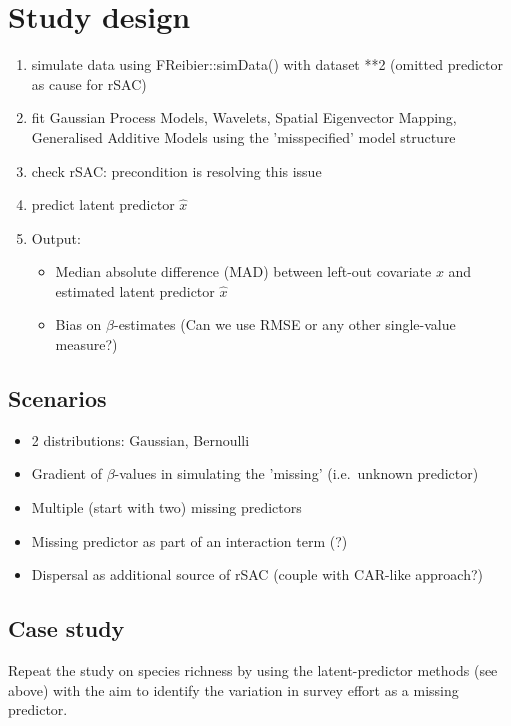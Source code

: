 \documentclass[11pt]{article}
\begin{document}
\section{Study design}
\begin{enumerate}
	\item simulate data using FReibier::simData() with dataset **2 (omitted predictor as cause for rSAC)
	\item fit Gaussian Process Models, Wavelets, Spatial Eigenvector Mapping, Generalised Additive Models using the 'misspecified' model structure
	\item check rSAC: precondition is resolving this issue
	\item predict latent predictor $\hat{x}$
	\item Output:
	\begin{itemize}
		\item Median absolute difference (MAD) between left-out covariate $x$ and estimated latent predictor $\hat{x}$
		\item Bias on $\beta$-estimates (Can we use RMSE or any other single-value measure?)
	\end{itemize}
\end{enumerate}

\subsection{Scenarios}
\begin{itemize}
	\item 2 distributions: Gaussian, Bernoulli
	\item Gradient of $\beta$-values in simulating the 'missing' (i.e.~unknown predictor)
	\item Multiple (start with two) missing predictors
	\item Missing predictor as part of an interaction term (?)
	\item Dispersal as additional source of rSAC (couple with CAR-like approach?)
\end{itemize}

\subsection{Case study}
Repeat the study on species richness by \citet{Mahecha2008} using the latent-predictor methods (see above) with the aim to identify the variation in survey effort as a missing predictor. 

 

\end{document}
